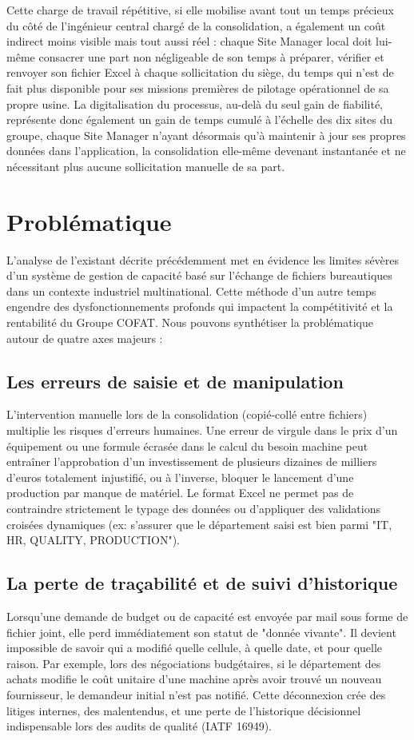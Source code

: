 Cette charge de travail répétitive, si elle mobilise avant tout un temps précieux du côté de l'ingénieur central chargé de la consolidation, a également un coût indirect moins visible mais tout aussi réel : chaque Site Manager local doit lui-même consacrer une part non négligeable de son temps à préparer, vérifier et renvoyer son fichier Excel à chaque sollicitation du siège, du temps qui n'est de fait plus disponible pour ses missions premières de pilotage opérationnel de sa propre usine. La digitalisation du processus, au-delà du seul gain de fiabilité, représente donc également un gain de temps cumulé à l'échelle des dix sites du groupe, chaque Site Manager n'ayant désormais qu'à maintenir à jour ses propres données dans l'application, la consolidation elle-même devenant instantanée et ne nécessitant plus aucune sollicitation manuelle de sa part.

\section{Problématique}
L'analyse de l'existant décrite précédemment met en évidence les limites sévères d'un système de gestion de capacité basé sur l'échange de fichiers bureautiques dans un contexte industriel multinational. Cette méthode d'un autre temps engendre des dysfonctionnements profonds qui impactent la compétitivité et la rentabilité du Groupe COFAT. Nous pouvons synthétiser la problématique autour de quatre axes majeurs :

\subsection{Les erreurs de saisie et de manipulation}
L'intervention manuelle lors de la consolidation (copié-collé entre fichiers) multiplie les risques d'erreurs humaines. Une erreur de virgule dans le prix d'un équipement ou une formule écrasée dans le calcul du besoin machine peut entraîner l'approbation d'un investissement de plusieurs dizaines de milliers d'euros totalement injustifié, ou à l'inverse, bloquer le lancement d'une production par manque de matériel. Le format Excel ne permet pas de contraindre strictement le typage des données ou d'appliquer des validations croisées dynamiques (ex: s'assurer que le département saisi est bien parmi "IT, HR, QUALITY, PRODUCTION").

\subsection{La perte de traçabilité et de suivi d'historique}
Lorsqu'une demande de budget ou de capacité est envoyée par mail sous forme de fichier joint, elle perd immédiatement son statut de "donnée vivante". Il devient impossible de savoir qui a modifié quelle cellule, à quelle date, et pour quelle raison. Par exemple, lors des négociations budgétaires, si le département des achats modifie le coût unitaire d'une machine après avoir trouvé un nouveau fournisseur, le demandeur initial n'est pas notifié. Cette déconnexion crée des litiges internes, des malentendus, et une perte de l'historique décisionnel indispensable lors des audits de qualité (IATF 16949).

